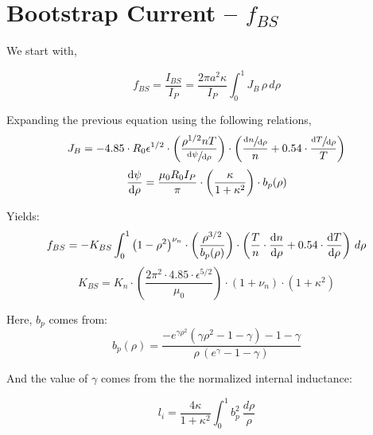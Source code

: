 \section{Bootstrap Current -- $f_{BS}$}

We start with,

\begin{equation}
	f_{BS} = \frac{I_{BS}}{I_P} = \frac{ 2 \pi a^2 \kappa }{I_P} \int_0^1 J_B \, \rho \, d\rho
\end{equation}

Expanding the previous equation using the following relations,
\begin{equation}
	J_B = -4.85 \cdot R_0 \epsilon^{1/2} \cdot \left( \frac{ \rho^{1/2} n T }{ \sfrac{ \textnormal{d}\psi }{ \textnormal{d}\rho } } \right) \cdot \left( \frac{ \sfrac{ \textnormal{d}n }{ \textnormal{d}\rho } }{ n } + 0.54 \cdot \frac{ \sfrac{ \textnormal{d}T }{ \textnormal{d}\rho } }{ T } \right)
\end{equation}
\begin{equation}
	\frac{ \textnormal{d}\psi }{ \textnormal{d}\rho } = \frac{ \mu_0 R_0 I_P }{ \pi } \cdot \left( \frac{ \kappa}{1+\kappa^2} \right) \cdot b_p(\rho)
\end{equation}

Yields:
\begin{equation}
	f_{BS} = -K_{BS} \int_0^1 \left( 1 - \rho^2  \right)^{\nu_n} \cdot \left( \frac{ \rho^{3/2} }{ b_p(\rho) } \right) \cdot \left( \frac{T}{ n } \cdot  \frac{ \textnormal{d}n }{ \textnormal{d}\rho } + 0.54 \cdot  \frac{ \textnormal{d}T }{ \textnormal{d}\rho }  \right)
 \, d\rho
\end{equation}
\begin{equation}
	K_{BS} = K_n \cdot \left( \frac{ 2 \pi^2 \cdot 4.85 \cdot \epsilon^{5/2} }{\mu_0} \right) \cdot ( 1 + \nu_n ) \cdot ( 1 + \kappa^2 )
\end{equation}

Here, $b_p$ comes from:
\begin{equation}
	b_p(\rho) = \frac{ -e^{\gamma\rho^2} ( \gamma\rho^2 - 1 - \gamma ) - 1 - \gamma }{\rho \,( e^\gamma - 1 - \gamma ) }
\end{equation}

And the value of $\gamma$ comes from the the normalized internal inductance:

\begin{equation}
	l_i = \frac{4 \kappa}{1+\kappa^2}	 \int_0^1 b_p^2 \ \frac{d\rho}{\rho}
\end{equation}

